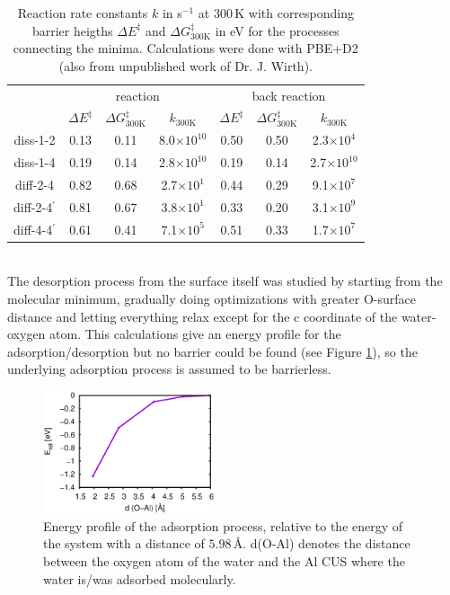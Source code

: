 \documentclass[11pt,DIV=13,BCOR=5mm,a4paper,headinclude]{scrbook}
\begin{document}
\begin{table}[!h]
  \centering
   \caption{Reaction rate constants $k$ in s$^{-1}$ at $300\,$K with corresponding barrier heigths $\Delta E^\ddagger$ and $\Delta G^\ddagger_\textrm{300K}$ in eV for the processes connecting the minima.
Calculations were done with PBE+D2 (also from unpublished work of Dr. J. Wirth).}
  \begin{tabular}{c|ccc||ccc}
  \toprule
   &\multicolumn{3}{c}{reaction} & \multicolumn{3}{c}{back reaction}\\
   &              $\Delta E^\ddagger$ & $\Delta G^\ddagger_\textrm{300K}$ &$k_\textrm{300K}$&$\Delta E^\ddagger$ & $\Delta G^\ddagger_\textrm{300K}$ &$k_\textrm{300K}$\\\midrule
diss-1-2         &0.13 & 0.11 & 8.0$\times 10^{10}$ & 0.50 & 0.50 & 2.3$\times 10^4$ \\
diss-1-4         &0.19 & 0.14 & 2.8$\times 10^{10}$ & 0.19 & 0.14 & 2.7$\times 10^{10}$\\
diff-2-4         &0.82 & 0.68 & 2.7$\times 10^1$ & 0.44 & 0.29 & 9.1$\times 10^7$ \\
diff-2-4$^\prime$&0.81 & 0.67 & 3.8$\times 10^1$ & 0.33 & 0.20 & 3.1$\times 10^9$\\
diff-4-4$^\prime$&0.61 & 0.41 & 7.1$\times 10^5$ & 0.51 & 0.33 & 1.7$\times 10^7$\\\bottomrule
    \end{tabular}
  \label{tab:0001_rates}
\end{table}
\\
The desorption process from the surface itself was studied by starting from the molecular minimum, gradually doing optimizations with greater O-surface distance and letting everything relax except for the c coordinate of the water-oxygen atom.
This calculations give an energy profile for the adsorption/desorption but no barrier could be found (see Figure \ref{abb:0001_desorption}), so the underlying adsorption process is assumed to be barrierless.
  \begin{figure}[!ht]
   \centering
   \includegraphics[width=0.45\textwidth]{figures/0001/mol_ads_barrier.eps}
   \caption{Energy profile of the adsorption process, relative to the energy of the system with a distance of $5.98\,$\AA.
d(O-Al) denotes the distance between the oxygen atom of the water and the Al CUS where the water is/was adsorbed molecularly.
   }
   \label{abb:0001_desorption}
  \end{figure}
\end{document}
